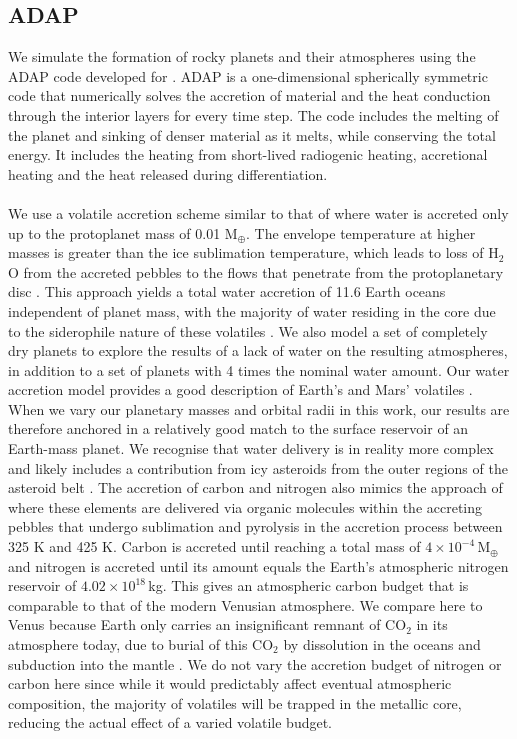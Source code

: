 \documentclass[bibyear,tradiabstract]{aa}
\begin{document}
\subsection{ADAP}
We simulate the formation of rocky planets and their atmospheres using the ADAP code developed for \cite{Johansen+2023I}. ADAP is a one-dimensional spherically symmetric code that numerically solves the accretion of material and the heat conduction through the interior layers for every time step. The code includes the melting of the planet and sinking of denser material as it melts, while conserving the total energy. It includes the heating from short-lived radiogenic heating, accretional heating and the heat released during differentiation.\\
\\
We use a volatile accretion scheme similar to that of \cite{Johansen+2023I} where water is accreted only up to the protoplanet mass of 0.01 M$_{\oplus}$. The envelope temperature at higher masses is greater than the ice sublimation temperature, which leads to loss of H$_2$O from the accreted pebbles to the flows that penetrate from the protoplanetary disc \citep{Johansen+2021,Wang+2023}. This approach yields a total water accretion of 11.6 Earth oceans independent of planet mass, with the majority of water residing in the core due to the siderophile nature of these volatiles \citep{Fischer+2020,Li+2020}. {We also model a set of completely dry planets to explore the results of a lack of water on the resulting atmospheres, in addition to a set of planets with 4 times the nominal water amount.} Our water accretion model provides a good description of Earth's and Mars' volatiles \citep{Johansen+2023III}. When we vary our planetary masses and orbital radii in this work, our results are therefore anchored in a relatively good match to the surface reservoir of an Earth-mass planet. We recognise that water delivery is in reality more complex and likely includes a contribution from icy asteroids from the outer regions of the asteroid belt \citep[e.g.][]{Raymond+2004}. The accretion of carbon and nitrogen also mimics the approach of \cite{Johansen+2023I} where these elements are delivered via organic molecules within the accreting pebbles that undergo sublimation and pyrolysis in the accretion process between 325 K and 425 K. Carbon is accreted until reaching a total mass of $4\times10^{-4}$\,M$_{\oplus}$ and nitrogen is accreted until its amount equals the Earth's atmospheric nitrogen reservoir of $4.02\times10^{18}\,$kg. This gives an atmospheric carbon budget that is comparable to that of the modern Venusian atmosphere. We compare here to Venus because Earth only carries an insignificant remnant of CO$_2$ in its atmosphere today, due to burial of this CO$_2$ by dissolution in the oceans and subduction into the mantle \citep{Dasgupta&Hirschmann2010}. {We do not vary the accretion budget of nitrogen or carbon here since while it would predictably affect eventual atmospheric composition, the majority of volatiles will be trapped in the metallic core, reducing the actual effect of a varied volatile budget.}
\end{document}
